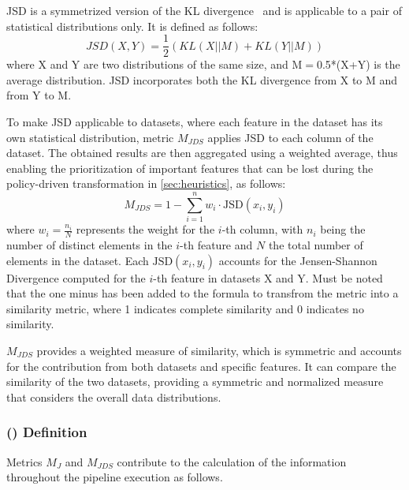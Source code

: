 JSD is a symmetrized version of the KL divergence~\cite{Fuglede} and is applicable to a pair of statistical distributions only. It is defined as follows:
\[JSD(X, Y) = \frac{1}{2} \left( KL(X || M)
  + KL(Y || M) \right)\]
%
where X and Y are two distributions of the same size, and M$=$0.5*(X+Y) is the average distribution.
JSD incorporates both the KL divergence from X to M and from Y to M.

To make JSD applicable to datasets, where each feature in the dataset has its own statistical distribution, metric $M_{JDS}$ applies JSD to each column of the dataset. The obtained results are then aggregated using a weighted average, thus enabling the prioritization of important features that can be lost during the policy-driven transformation in \cref{sec:heuristics}, as follows: \[M_{JDS} = 1 - \sum_{i=1}^n w_i \cdot \text{JSD}(x_i,y_i)\]
where \(w_i = \frac{n_i}{N}\) represents the weight for the \(i\)-th column, with \(n_i\) being the number of distinct elements in the $i$-th feature and \(N\) the total number of elements in the dataset. Each \(\text{JSD}(x_i,y_i)\) accounts for the Jensen-Shannon Divergence computed for the \(i\)-th feature in datasets X and Y.
Must be noted that the one minus has been added to the formula to transfrom the metric into a similarity metric, where 1 indicates complete similarity and 0 indicates no similarity.

$M_{JDS}$ provides a weighted measure of similarity, which is symmetric and accounts for the contribution from both datasets and specific features. It can compare the similarity of the two datasets, providing a symmetric and normalized measure that considers the overall data distributions.


\subsubsection{\Quality (\q) Definition}

Metrics $M_J$ and $M_{JDS}$ contribute to the calculation of the information \quality \textit{\q} throughout the pipeline execution as follows. %

